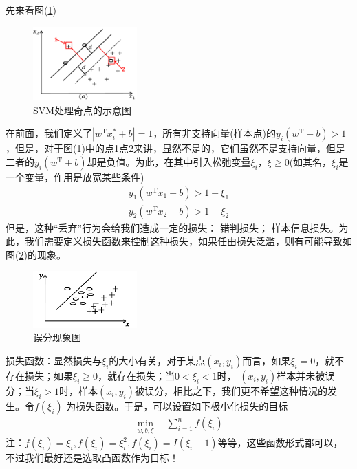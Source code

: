 	\par
	先来看图(\ref{fig:SVM处理奇点的示意图})
		\begin{figure}[H]
		\centering
		\includegraphics[width=4cm]{images/SVMdeal_with_different_point.jpg}
		\caption{SVM处理奇点的示意图}
		\label{fig:SVM处理奇点的示意图}
		\end{figure}
	在前面，我们定义了$|w^\mathrm{T}x_i^*+b|=1$，所有非支持向量(样本点)的$y_i(w^\mathrm{T}+b)>1$，但是，对于图(\ref{fig:SVM处理奇点的示意图})中的点1点2来讲，显然不是的，它们虽然不是支持向量，但是二者的$y_i(w^\mathrm{T}+b)$却是负值。为此，在其中引入松弛变量$\xi_i$，$\xi \geqslant  0$(如其名，$\xi_i$是一个变量，作用是放宽某些条件)
	\begin{align*}
	y_1(w^\mathrm{T}x_1+b)>1-\xi_1\\
	y_2(w^\mathrm{T}x_2+b)>1-\xi_2
	\end{align*}
	但是，这种“丢弃”行为会给我们造成一定的损失： 错判损失； 样本信息损失。为此，我们需要定义损失函数来控制这种损失，如果任由损失泛滥，则有可能导致如图(\ref{fig:误分现象图})的现象。\\
		\begin{figure}[H]
		\centering
		\includegraphics[width=4cm]{images/false_classify.jpg}
		\caption{误分现象图}
		\label{fig:误分现象图}
		\end{figure}
	\par
	损失函数：显然损失与$\xi_i$的大小有关，对于某点$(x_i,y_i)$而言，如果$\xi_i=0$，就不存在损失；如果$\xi_i \geqslant 0$，就存在损失；当$0<\xi_i<1$时，
	$(x_i,y_i)$样本并未被误分；当$\xi_i>1$时，样本$(x_i,y_i)$被误分，相比之下，我们更不希望这种情况的发生。令$f(\xi_i)$ 为损失函数。于是，可以设置如下极小化损失的目标
	\begin{align*}
	\min_{w,b,\xi}\quad\sum_{i=1}^n f(\xi_i)
	\end{align*}
	注：$f(\xi_i)=\xi_i,f(\xi_i)=\xi_i^2,f(\xi_i)=I(\xi_i-1)$等等，这些函数形式都可以，不过我们最好还是选取凸函数作为目标！
